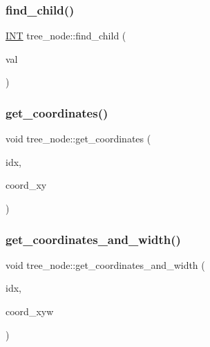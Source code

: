 \mbox{\label{classtree__node_a14c6788e5e4e343815c22a8260365509}} 
\subsubsection{\texorpdfstring{find\+\_\+child()}{find\_child()}}
{\footnotesize\ttfamily \mbox{\hyperlink{galois_8h_a09fddde158a3a20bd2dcadb609de11dc}{I\+NT}} tree\+\_\+node\+::find\+\_\+child (\begin{DoxyParamCaption}\item[{\mbox{\hyperlink{galois_8h_a09fddde158a3a20bd2dcadb609de11dc}{I\+NT}}}]{val }\end{DoxyParamCaption})}

\mbox{\label{classtree__node_a4f8b497531ce2914cdb717dc554ccde6}} 
\subsubsection{\texorpdfstring{get\+\_\+coordinates()}{get\_coordinates()}}
{\footnotesize\ttfamily void tree\+\_\+node\+::get\+\_\+coordinates (\begin{DoxyParamCaption}\item[{\mbox{\hyperlink{galois_8h_a09fddde158a3a20bd2dcadb609de11dc}{I\+NT}} \&}]{idx,  }\item[{\mbox{\hyperlink{galois_8h_a09fddde158a3a20bd2dcadb609de11dc}{I\+NT}} $\ast$}]{coord\+\_\+xy }\end{DoxyParamCaption})}

\mbox{\label{classtree__node_a8d71d0fe771485a03975f1d1e224f170}} 
\subsubsection{\texorpdfstring{get\+\_\+coordinates\+\_\+and\+\_\+width()}{get\_coordinates\_and\_width()}}
{\footnotesize\ttfamily void tree\+\_\+node\+::get\+\_\+coordinates\+\_\+and\+\_\+width (\begin{DoxyParamCaption}\item[{\mbox{\hyperlink{galois_8h_a09fddde158a3a20bd2dcadb609de11dc}{I\+NT}} \&}]{idx,  }\item[{\mbox{\hyperlink{galois_8h_a09fddde158a3a20bd2dcadb609de11dc}{I\+NT}} $\ast$}]{coord\+\_\+xyw }\end{DoxyParamCaption})}

